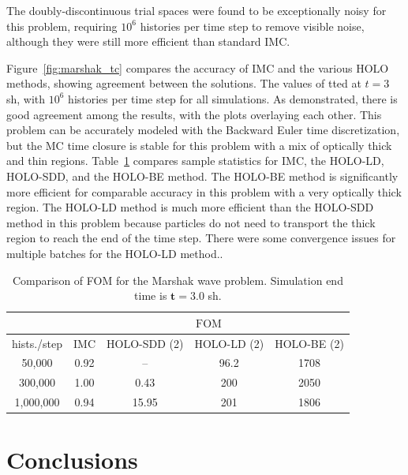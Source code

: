 \documentclass{anstrans}
\newcommand{\FOM}{\ensuremath{\text{FOM}}}
\begin{document}
The doubly-discontinuous trial spaces were found to be exceptionally noisy for this problem, 
requiring $10^6$ histories per time step to remove visible noise, although they were still more
efficient than standard IMC.

Figure~\ref{fig:marshak_tc} compares the accuracy of IMC and the various HOLO methods, showing
agreement between the solutions.  The values of tted at $t=3$ sh, with $10^6$ histories per time step for all
simulations. As demonstrated, there is good agreement among the results, with the plots overlaying
each other.  This problem can be accurately modeled with the Backward Euler time discretization, but
the MC time closure is stable for this problem with a mix of optically thick and thin
regions. Table~\ref{tab:marshak_cont} compares sample statistics for IMC,
the HOLO-LD, HOLO-SDD, and the HOLO-BE
method. The HOLO-BE method is significantly more efficient for comparable accuracy in this problem with a very
optically thick region.  The HOLO-LD method is much more efficient than the HOLO-SDD method in this
problem because particles do not need to transport the thick region to reach the end of the time
step. There were some convergence issues for multiple batches for the HOLO-LD method..


\begin{table}[H]
\centering
\caption{\label{tab:marshak_cont} {Comparison of FOM for the Marshak
    wave problem.  Simulation end time is $\mathbf{t=3.0}$ sh.}}
\begin{tabular}{|c|cccc|}\cline{2-5}
    \multicolumn{1}{c|}{}        &
    \multicolumn{4}{|c|}{\FOM} \\ \hline
hists./step    &  IMC   & HOLO-SDD (2) & HOLO-LD (2) & HOLO-BE (2)   \\ \hline
   50,000      &  0.92  &   --         &  96.2      & 1708             \\
  300,000      &  1.00  &   0.43       &  200     & 2050         \\  
  1,000,000    &  0.94  &  15.95       &  201     & 1806          \\ \hline
\end{tabular}
\end{table}

\section{Conclusions}
\end{document}
